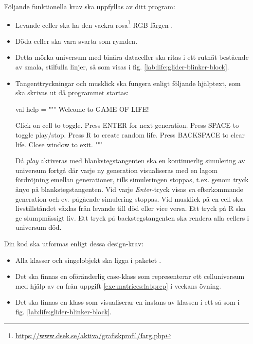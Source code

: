 Följande funktionella krav ska uppfyllas av ditt program:
\begin{itemize}[nosep, label={$\square$},]
\item Levande celler ska ha den vackra rosa\footnote{\url{https://www.dsek.se/aktiva/grafiskprofil/farg.php}} RGB-färgen .
\item Döda celler ska vara svarta som rymden.
\item Detta mörka universum med binära dataceller ska ritas i ett rutnät bestående av smala, stilfulla linjer, så som visas i fig. \ref{lab:life:glider-blinker-block}.
\item Tangenttryckningar och musklick ska fungera enligt följande hjälptext, som ska skrivas ut då programmet startas:
\begin{CodeSmall}
  val help = """
    Welcome to GAME OF LIFE!

    Click on cell to toggle.
    Press ENTER for next generation.
    Press SPACE to toggle play/stop.
    Press R to create random life.
    Press BACKSPACE to clear life.
    Close window to exit.
  """
\end{CodeSmall}
Då \emph{play} aktiveras med blankstegstangenten ska en kontinuerlig simulering av universum fortgå där varje ny generation visualiseras med en lagom fördröjning emellan generationer, tills simuleringen stoppas, t.ex. genom tryck ånyo på blankstegstangenten. Vid varje \emph{Enter}-tryck visas \emph{en} efterkommande generation och ev. pågående simulering stoppas. Vid musklick på en cell ska livstillståndet växlas från levande till död eller vice versa. Ett tryck på R ska ge slumpmässigt liv. Ett tryck på backstegstangenten ska rendera alla cellers i universum död.

\end{itemize}

\vspace{1em}\noindent Din kod ska utformas enligt dessa design-krav:
\begin{itemize}[nosep, label={$\square$}]
\item Alla klasser och singelobjekt ska ligga i paketet .
\item Det ska finnas en oföränderlig case-klass  som representerar ett celluniversum med hjälp av en  från uppgift \ref{exe:matrices:labprep} i veckans övning.
\item Det ska finnas en klass  som visualiserar en  instans av klassen  i ett   så som i fig. \ref{lab:life:glider-blinker-block}.
\end{itemize}


